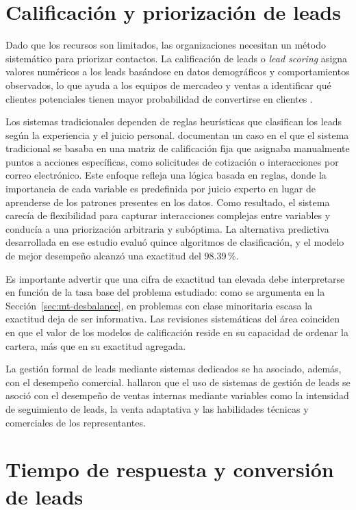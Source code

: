 \section{Calificación y priorización de leads}

Dado que los recursos son limitados, las organizaciones necesitan un método
sistemático para priorizar contactos. La calificación de leads o \emph{lead
scoring} asigna valores numéricos a los leads basándose en datos demográficos y
comportamientos observados, lo que ayuda a los equipos de mercadeo y ventas a
identificar qué clientes potenciales tienen mayor probabilidad de convertirse en
clientes \cite{wu2023state}.

Los sistemas tradicionales dependen de reglas heurísticas que clasifican los leads
según la experiencia y el juicio personal. 
documentan un caso en el que el sistema tradicional se basaba en una matriz de
calificación fija que asignaba manualmente puntos a acciones específicas, como
solicitudes de cotización o interacciones por correo electrónico. Este enfoque
refleja una lógica basada en reglas, donde la importancia de cada variable es
predefinida por juicio experto en lugar de aprenderse de los patrones presentes en
los datos. Como resultado, el sistema carecía de flexibilidad para capturar
interacciones complejas entre variables y conducía a una priorización arbitraria y
subóptima. La alternativa predictiva desarrollada en ese estudio evaluó quince
algoritmos de clasificación, y el modelo de mejor desempeño alcanzó una exactitud
del 98.39\,\%.

Es importante advertir que una cifra de exactitud tan elevada debe interpretarse en
función de la tasa base del problema estudiado: como se argumenta en la
Sección~\ref{sec:mt-desbalance}, en problemas con clase minoritaria escasa la
exactitud deja de ser informativa. Las revisiones sistemáticas del área
 coinciden en que el valor de los modelos de calificación reside
en su capacidad de ordenar la cartera, más que en su exactitud agregada.

La gestión formal de leads mediante sistemas dedicados se ha asociado, además, con
el desempeño comercial.  hallaron que el uso de sistemas de
gestión de leads se asoció con el desempeño de ventas internas mediante variables
como la intensidad de seguimiento de leads, la venta adaptativa y las habilidades
técnicas y comerciales de los representantes.

\section{Tiempo de respuesta y conversión de leads}

